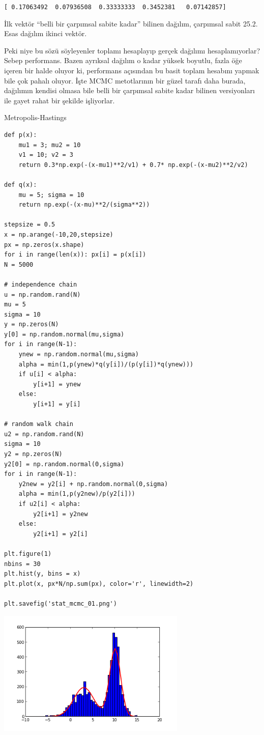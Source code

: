 \documentclass[12pt,fleqn]{article}\usepackage{../../common}
\begin{document}
\verb![ 0.17063492  0.07936508  0.33333333  0.3452381   0.07142857]!

İlk vektör ``belli bir çarpımsal sabite kadar'' bilinen dağılım, çarpımsal
sabit 25.2. Esas dağılım ikinci vektör. 

Peki niye bu sözü söyleyenler toplamı hesaplayıp gerçek dağılımı
hesaplamıyorlar? Sebep performans. Bazen ayrıksal dağılım o kadar yüksek
boyutlu, fazla öğe içeren bir halde oluyor ki, performans açısından bu
basit toplam hesabını yapmak bile çok pahalı oluyor. İşte MCMC metotlarının
bir güzel tarafı daha burada, dağılımın kendisi olmasa bile belli bir
çarpımsal sabite kadar bilinen versiyonları ile gayet rahat bir şekilde
işliyorlar.

Metropolis-Hastings

\begin{verbatim}
def p(x):
    mu1 = 3; mu2 = 10
    v1 = 10; v2 = 3
    return 0.3*np.exp(-(x-mu1)**2/v1) + 0.7* np.exp(-(x-mu2)**2/v2)

def q(x):
    mu = 5; sigma = 10
    return np.exp(-(x-mu)**2/(sigma**2))

stepsize = 0.5
x = np.arange(-10,20,stepsize)
px = np.zeros(x.shape)
for i in range(len(x)): px[i] = p(x[i])
N = 5000

# independence chain
u = np.random.rand(N)
mu = 5
sigma = 10
y = np.zeros(N)
y[0] = np.random.normal(mu,sigma)
for i in range(N-1):
    ynew = np.random.normal(mu,sigma)
    alpha = min(1,p(ynew)*q(y[i])/(p(y[i])*q(ynew)))
    if u[i] < alpha:
        y[i+1] = ynew
    else:
        y[i+1] = y[i]

# random walk chain
u2 = np.random.rand(N)
sigma = 10
y2 = np.zeros(N)
y2[0] = np.random.normal(0,sigma)
for i in range(N-1):
    y2new = y2[i] + np.random.normal(0,sigma)
    alpha = min(1,p(y2new)/p(y2[i]))
    if u2[i] < alpha:
        y2[i+1] = y2new
    else:
        y2[i+1] = y2[i]

plt.figure(1)
nbins = 30
plt.hist(y, bins = x)
plt.plot(x, px*N/np.sum(px), color='r', linewidth=2)

plt.savefig('stat_mcmc_01.png')
\end{verbatim}

\includegraphics[height=6cm]{stat_mcmc_01.png}
\end{document}
